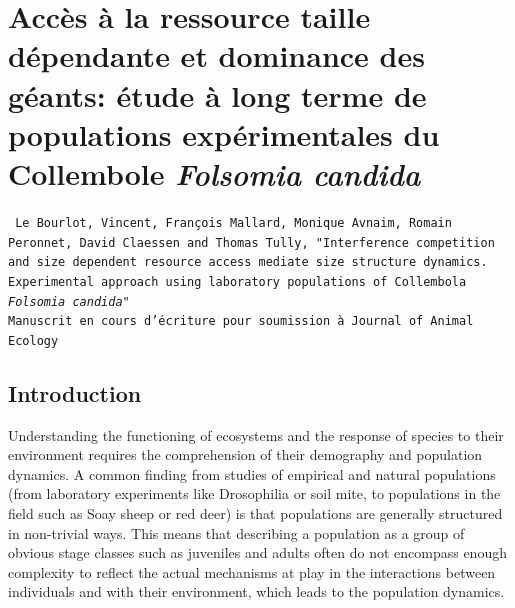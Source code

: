 \chapter{Accès à la ressource taille
dépendante et dominance des géants: étude à long terme de populations
expérimentales du Collembole \textit{Folsomia candida}}\label{Ann:SP}

\vspace{2cm}

\begin{Spacing}{1}
\texttt{
Le Bourlot, Vincent, François Mallard, Monique Avnaim, Romain Peronnet, David
Claessen and Thomas Tully, "Interference competition and size dependent resource
access mediate size structure dynamics. Experimental approach using laboratory
populations of Collembola \textit{Folsomia candida}"\\
Manuscrit en cours d'écriture pour soumission à Journal of Animal Ecology}
\end{Spacing}


\section{Introduction}

Understanding the functioning of ecosystems and the response of species to their
environment requires the comprehension of their demography and population
dynamics. A common finding from studies of empirical and natural populations
(from laboratory experiments like Drosophilia  or soil mite, to populations in
the field such as Soay sheep  or red deer) is that populations are generally
structured in non-trivial ways.
This means that describing a population as a group of obvious stage classes such
as juveniles and adults often do not encompass enough complexity to reflect the
actual mechanisms at play in the interactions between individuals and with their
environment, which leads to the population dynamics.

